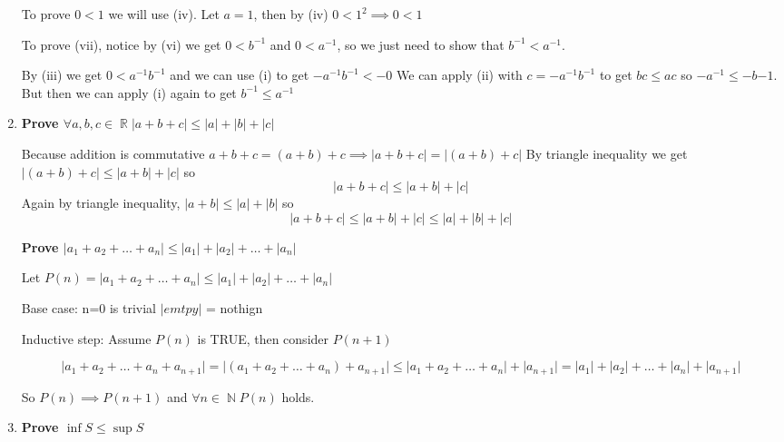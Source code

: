 \documentclass[10pt,a4paper]{article}
\DeclareMathOperator*{\R}{\mathbb{R}}
\DeclareMathOperator*{\N}{\mathbb{N}}
\begin{document}
\begin{enumerate}
        To prove $0<1$ we will use (iv). Let $a = 1$, then by (iv) $0 < 1^2 \implies 0 < 1$

        To prove (vii), notice by (vi) we get $ 0 < b^{-1} $ and $0 < a^{-1}$, so we just need to show that $b^{-1} < a^{-1}$. 

        By (iii) we get $ 0 < a^{-1} b^{-1}$ and we can use (i) to get $ -a^{-1}b^{-1} < -0$
        We can apply (ii) with $ c = -a^{-1}b^{-1}$ to get $bc \leq ac $ so 
        $ - a^{-1} \leq -b{-1}$. But then we can apply (i) again to get $b^{-1} \leq a^{-1}$ 

    \item \textbf{Prove $\forall a, b, c \in \R \lvert a+b+c\rvert \leq \lvert a \rvert+\lvert b \rvert+\lvert c \rvert $}

        Because addition is commutative $a+b+c = (a+b)+c \implies \lvert a+b+c\rvert = \lvert (a+b)+c\rvert$
        By triangle inequality we get $\lvert(a+b)+c\rvert \leq \lvert a+b\rvert + \lvert c \rvert$ so 
        $$
            \lvert a+b+c\rvert \leq \lvert a+b\rvert + \lvert c \rvert
        $$
        Again by triangle inequality,  $\lvert a+b\rvert \leq \lvert a\rvert + \lvert b \rvert$ so 
        $$
            \lvert a+b+c\rvert \leq \lvert a+b\rvert + \lvert c \rvert \leq \lvert a\rvert + \lvert b\rvert + \lvert c\rvert
        $$

        \textbf{Prove $\lvert a_1 + a_2 + \ldots + a_n \rvert \leq \lvert a_1 \rvert +\lvert a_2 \rvert +\ldots + \lvert a_n \rvert $}

        Let $P(n) = \lvert a_1 + a_2 + \ldots + a_n \rvert \leq \lvert a_1 \rvert +\lvert a_2 \rvert +\ldots + \lvert a_n \rvert$

        Base case: n=0 is trivial $\lvert emtpy \rvert$ = nothign 

        Inductive step: Assume $P(n)$ is TRUE, then consider $P(n+1)$

        $$
            \lvert a_1 + a_2 + \ldots +a_n + a_{n+1} \rvert  = 
            \lvert (a_1 + a_2 + \ldots +a_n) + a_{n+1} \rvert \leq
            \lvert a_1+ a_2+\ldots +a_n \rvert + \lvert a_{n+1}\rvert = 
            \lvert a_1 \rvert +\lvert a_2 \rvert +\ldots + \lvert a_n \rvert + \lvert a_{n+1}\rvert
        $$

        So $P(n) \implies P(n+1)$ and $\forall n \in \N P(n)$ holds.
 


    \item  \textbf{Prove $ \inf S \leq \sup S $}


\end{enumerate}
\end{document}
